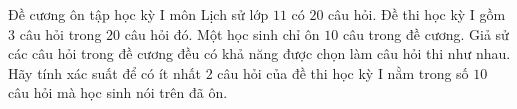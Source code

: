 \begin{vd}[Mức 2]%
	Đề cương ôn tập học kỳ I môn Lịch sử lớp $ 11 $ có $ 20 $ câu hỏi. Đề thi học kỳ I gồm $ 3 $ câu hỏi trong $ 20 $ câu hỏi đó. Một học sinh chỉ ôn $ 10 $ câu trong đề cương. Giả sử các câu hỏi trong đề cương đều có khả năng được chọn làm câu hỏi thi như nhau. Hãy tính xác suất để có ít nhất $ 2 $ câu hỏi của đề thi học kỳ I nằm trong số $ 10 $ câu hỏi mà học sinh nói trên đã ôn.	
\end{vd}

